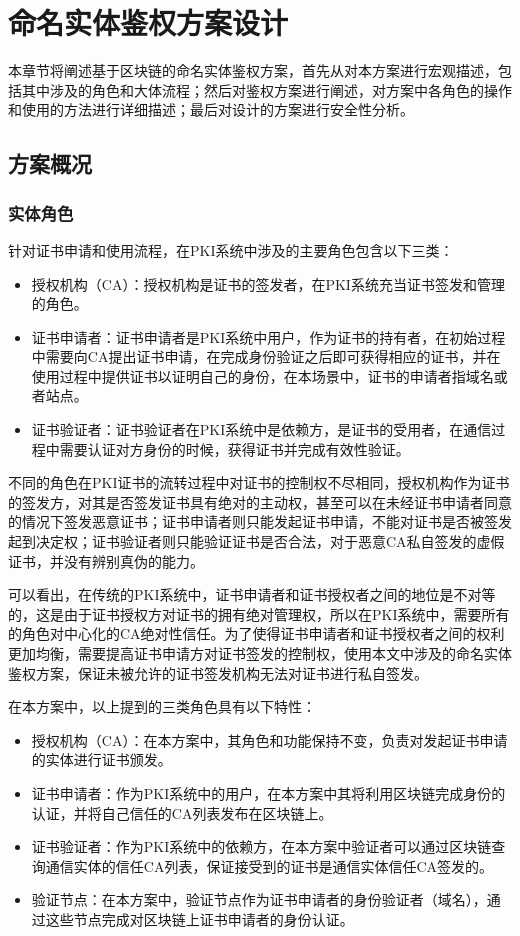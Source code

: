 
\chapter{命名实体鉴权方案设计}

本章节将阐述基于区块链的命名实体鉴权方案，首先从对本方案进行宏观描述，包括其中涉及的角色和大体流程；然后对鉴权方案进行阐述，对方案中各角色的操作和使用的方法进行详细描述；最后对设计的方案进行安全性分析。

\section{方案概况}

\subsection{实体角色}

针对证书申请和使用流程，在PKI系统中涉及的主要角色包含以下三类：
\begin{itemize}
	\item 授权机构（CA）：授权机构是证书的签发者，在PKI系统充当证书签发和管理的角色。
	\item 证书申请者：证书申请者是PKI系统中用户，作为证书的持有者，在初始过程中需要向CA提出证书申请，在完成身份验证之后即可获得相应的证书，并在使用过程中提供证书以证明自己的身份，在本场景中，证书的申请者指域名或者站点。
	\item 证书验证者：证书验证者在PKI系统中是依赖方，是证书的受用者，在通信过程中需要认证对方身份的时候，获得证书并完成有效性验证。
\end{itemize}

不同的角色在PKI证书的流转过程中对证书的控制权不尽相同，授权机构作为证书的签发方，对其是否签发证书具有绝对的主动权，甚至可以在未经证书申请者同意的情况下签发恶意证书；证书申请者则只能发起证书申请，不能对证书是否被签发起到决定权；证书验证者则只能验证证书是否合法，对于恶意CA私自签发的虚假证书，并没有辨别真伪的能力。

可以看出，在传统的PKI系统中，证书申请者和证书授权者之间的地位是不对等的，这是由于证书授权方对证书的拥有绝对管理权，所以在PKI系统中，需要所有的角色对中心化的CA绝对性信任。为了使得证书申请者和证书授权者之间的权利更加均衡，需要提高证书申请方对证书签发的控制权，使用本文中涉及的命名实体鉴权方案，保证未被允许的证书签发机构无法对证书进行私自签发。

在本方案中，以上提到的三类角色具有以下特性：
\begin{itemize}
	\item 授权机构（CA）：在本方案中，其角色和功能保持不变，负责对发起证书申请的实体进行证书颁发。
	\item 证书申请者：作为PKI系统中的用户，在本方案中其将利用区块链完成身份的认证，并将自己信任的CA列表发布在区块链上。
	\item 证书验证者：作为PKI系统中的依赖方，在本方案中验证者可以通过区块链查询通信实体的信任CA列表，保证接受到的证书是通信实体信任CA签发的。
	\item 验证节点：在本方案中，验证节点作为证书申请者的身份验证者（域名），通过这些节点完成对区块链上证书申请者的身份认证。
\end{itemize}

